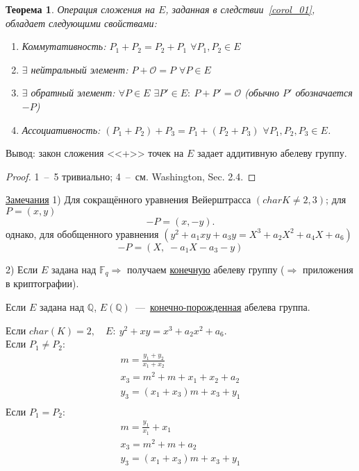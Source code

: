 \documentclass[12pt]{article}
\newcommand{\Q}{{{\mathbb Q}}}
\newcommand{\F}{{{\mathbb F}}}
\newtheorem{theorem}{Теорема}
\theoremstyle{definition}
\theoremstyle{definition}
\theoremstyle{definition}
\begin{document}
    \begin{theorem}
    	\label{theor_02}
    	Операция сложения на $E$, заданная в следствии~\ref{corol_01}, обладает следующими свойствами:
    	\begin{enumerate}
    		\item Коммутативность: ${P_1} + {P_2} = {P_2} + {P_1}$ $\forall {P_1},{P_2} \in E$
    		
    		\item $\exists $ нейтральный элемент: $P + \mathcal{O} = P$ $\forall P \in E$
    		
    		\item $\exists$ обратный элемент: $\forall P \in E$ $\exists P' \in E:\:P + P' = \mathcal{O}$ (обычно $P'$ обозначается $-P$)
    		
    		\item Ассоциативность: $\left( {{P_1} + {P_2}} \right) + {P_3} = {P_1} + \left( {{P_2} + {P_3}} \right)$ $\forall {P_1},{P_2},{P_3} \in E$.
    	\end{enumerate}
    \end{theorem}
    
    Вывод: закон сложения <<+>> точек на $E$ задает аддитивную абелеву группу.
    
    \begin{proof}
    1~--~5 тривиально; 4~--~см. Washington, Sec. 2.4.
    \end{proof}
    
    \underline{Замечания} 1) Для сокращённого уравнения Вейерштрасса $\left(char K \ne 2,3 \right)$; для $P = \left( {x,y} \right)$ 
    \[
    - P = \left( {x, - y} \right).
    \] 
    однако, для обобщенного уравнения $\left( {{y^2} + {a_1}xy + {a_3}y = {X^3} + {a_2}{X^2} + {a_4}X + {a_6}} \right)$ 
    \[ 
    - P = \left( {X,\; - {a_1}X - {a_3} - y} \right)
    \]
    
    2) Если $E$ задана над $\F_q \Rightarrow $ получаем \underline{конечную} абелеву группу ($ \Rightarrow $ приложения в криптографии).

    Если $E$ задана над $\Q$, $E\left( \Q \right)$~---~\underline{конечно-порожденная} абелева группа. 

    Если $char(K) = 2, \quad E:\:{y^2} + xy = {x^3} + {a_2}{x^2} + {a_6}$. \\
    Если ${P_1} \ne {P_2}$:
    \begin{gather*}
    m = \frac{y_1 + y_2}{x_1 + x_2} \\ 
    x_3 = m^2 + m + x_1 + x_2 + a_2 \\ 
    y_3 = ( x_1 + x_3)m + x_3 + y_1 \\
    \end{gather*}
    Если ${P_1} = {P_2}$:
    \begin{gather*}
    m = \frac{y_1}{x_1} + x_1 \\
    x_3 = m^2 + m + a_2 \\
    y_3 =( {x_1 + x_3})m + x_3 + y_1
    \end{gather*}
    
\end{document}
